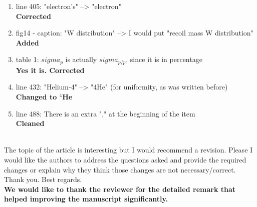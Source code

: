 \documentclass[a4paper,11pt,twoside]{article}
\begin{document}
\begin{enumerate}
\item line 405: "electron's" --> "electron"\\
{ \bf Corrected} 

\item fig14 - caption: "W distribution" --> I would put "recoil mass W 
   distribution"\\
{ \bf Added} 

\item table 1: $sigma_{p}$ is actually $sigma_{p/p}$, since it is in 
   percentage\\
{ \bf Yes it is. Corrected } 

\item line 432: "Helium-4" --> "4He" (for uniformity, as was written before)\\
{ \bf Changed to $^4$He} 

\item line 488: There is an extra "," at the beginning of the item\\
{ \bf Cleaned}\\
~\\
\end{enumerate}

The topic of the article is interesting but I would recommend a revision.  
Please I would like the authors to address the questions asked and provide the 
required changes or explain why they think those changes are not 
necessary/correct. Thank you. Best regards.\\

{ \bf We would like to thank the reviewer for the detailed remark that
helped improving the manuscript significantly.}
\end{document}
